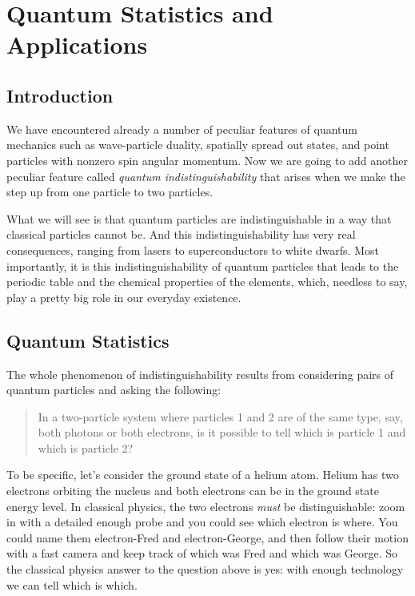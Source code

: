 \chapter{Quantum Statistics and Applications}
\label{chapter:quantum_statistics}

\section{Introduction}
\label{sec:quantum_statistics_intro}

We have encountered already a number of peculiar features of quantum
mechanics such as wave-particle duality, spatially spread out states,
and point particles with nonzero spin angular momentum.  Now we are
going to add another peculiar feature called \textit{quantum
  indistinguishability} that arises when we make the step up from
one particle to two particles.

What we will see is that quantum particles are indistinguishable in a
way that classical particles cannot be.  And this indistinguishability
has very real consequences, ranging from lasers to superconductors to
white dwarfs.  Most importantly, it is this indistinguishability of
quantum particles that leads to the periodic table and the chemical
properties of the elements, which, needless to say, play a pretty big
role in our everyday existence.


\section{Quantum Statistics}
\label{sec:quantum_statistics_indistinguishability}

The whole phenomenon of indistinguishability results from considering
pairs of quantum particles and asking the following:
\begin{quote}
In a two-particle system where particles 1 and 2 are of the same type,
say, both photons or both electrons, is it possible to tell which is
particle 1 and which is particle 2?
\end{quote}
To be specific, let's consider the ground state of a helium atom.
Helium has two electrons orbiting the nucleus and both electrons can
be in the ground state energy level.  In classical physics, the two
electrons \textit{must} be distinguishable: zoom in with a detailed
enough probe and you could see which electron is where.  You could
name them electron-Fred and electron-George, and then follow their
motion with a fast camera and keep track of which was Fred and which
was George.  So the classical physics answer to the question above is
yes: with enough technology we can tell which is which.

